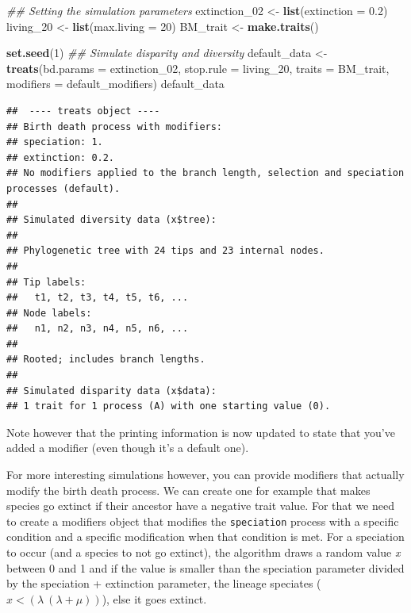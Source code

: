\documentclass[
]{book}
\newenvironment{Shaded}{\begin{snugshade}}{\end{snugshade}}
\newcommand{\CommentTok}[1]{\textcolor[rgb]{0.56,0.35,0.01}{\textit{#1}}}
\newcommand{\DataTypeTok}[1]{\textcolor[rgb]{0.13,0.29,0.53}{#1}}
\newcommand{\DecValTok}[1]{\textcolor[rgb]{0.00,0.00,0.81}{#1}}
\newcommand{\FloatTok}[1]{\textcolor[rgb]{0.00,0.00,0.81}{#1}}
\newcommand{\KeywordTok}[1]{\textcolor[rgb]{0.13,0.29,0.53}{\textbf{#1}}}
\newcommand{\NormalTok}[1]{#1}
\newcommand{\StringTok}[1]{\textcolor[rgb]{0.31,0.60,0.02}{#1}}
\begin{document}
\begin{Shaded}
\begin{Highlighting}[]
\CommentTok{\#\# Setting the simulation parameters}
\NormalTok{extinction\_}\DecValTok{02}\NormalTok{ \textless{}{-}}\StringTok{ }\KeywordTok{list}\NormalTok{(}\DataTypeTok{extinction =} \FloatTok{0.2}\NormalTok{)}
\NormalTok{living\_}\DecValTok{20}\NormalTok{     \textless{}{-}}\StringTok{ }\KeywordTok{list}\NormalTok{(}\DataTypeTok{max.living =} \DecValTok{20}\NormalTok{)}
\NormalTok{BM\_trait      \textless{}{-}}\StringTok{ }\KeywordTok{make.traits}\NormalTok{()}

\KeywordTok{set.seed}\NormalTok{(}\DecValTok{1}\NormalTok{)}
\CommentTok{\#\# Simulate disparity and diversity}
\NormalTok{default\_data \textless{}{-}}\StringTok{ }\KeywordTok{treats}\NormalTok{(}\DataTypeTok{bd.params =}\NormalTok{ extinction\_}\DecValTok{02}\NormalTok{,}
                     \DataTypeTok{stop.rule =}\NormalTok{ living\_}\DecValTok{20}\NormalTok{,}
                     \DataTypeTok{traits    =}\NormalTok{ BM\_trait,}
                     \DataTypeTok{modifiers =}\NormalTok{ default\_modifiers)}
\NormalTok{default\_data}
\end{Highlighting}
\end{Shaded}

\begin{verbatim}
##  ---- treats object ---- 
## Birth death process with modifiers:
## speciation: 1.
## extinction: 0.2.
## No modifiers applied to the branch length, selection and speciation processes (default).
## 
## Simulated diversity data (x$tree):
## 
## Phylogenetic tree with 24 tips and 23 internal nodes.
## 
## Tip labels:
##   t1, t2, t3, t4, t5, t6, ...
## Node labels:
##   n1, n2, n3, n4, n5, n6, ...
## 
## Rooted; includes branch lengths.
## 
## Simulated disparity data (x$data):
## 1 trait for 1 process (A) with one starting value (0).
\end{verbatim}

Note however that the printing information is now updated to state that you've added a modifier (even though it's a default one).

For more interesting simulations however, you can provide modifiers that actually modify the birth death process.
We can create one for example that makes species go extinct if their ancestor have a negative trait value.
For that we need to create a modifiers object that modifies the \texttt{speciation} process with a specific condition and a specific modification when that condition is met.
For a speciation to occur (and a species to not go extinct), the algorithm draws a random value \emph{x} between 0 and 1 and if the value is smaller than the speciation parameter divided by the speciation + extinction parameter, the lineage speciates (\(x < (\lambda \ (\lambda + \mu))\)), else it goes extinct.
\end{document}
